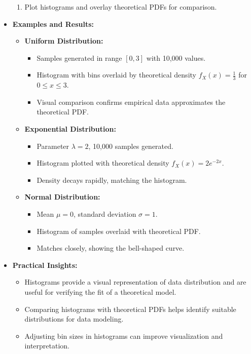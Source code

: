 \documentclass{article}
\begin{document}
\begin{itemize}
\begin{enumerate}
      \item Plot histograms and overlay theoretical PDFs for comparison.
    \end{enumerate}

  \item \textbf{Examples and Results:}
    \begin{itemize}
      \item \textbf{Uniform Distribution:}
        \begin{itemize}
          \item Samples generated in range $[0, 3]$ with 10,000 values.
          \item Histogram with bins overlaid by theoretical density $f_X(x) = \frac{1}{3}$ for $0 \leq x \leq 3$.
          \item Visual comparison confirms empirical data approximates the theoretical PDF.
        \end{itemize}

      \item \textbf{Exponential Distribution:}
        \begin{itemize}
          \item Parameter $\lambda = 2$, 10,000 samples generated.
          \item Histogram plotted with theoretical density $f_X(x) = 2e^{-2x}$.
          \item Density decays rapidly, matching the histogram.
        \end{itemize}

      \item \textbf{Normal Distribution:}
        \begin{itemize}
          \item Mean $\mu = 0$, standard deviation $\sigma = 1$.
          \item Histogram of samples overlaid with theoretical PDF.
          \item Matches closely, showing the bell-shaped curve.
        \end{itemize}
    \end{itemize}

  \item \textbf{Practical Insights:}
    \begin{itemize}
      \item Histograms provide a visual representation of data distribution and are useful for verifying the fit of a theoretical model.
      \item Comparing histograms with theoretical PDFs helps identify suitable distributions for data modeling.
      \item Adjusting bin sizes in histograms can improve visualization and interpretation.
    \end{itemize}


\end{itemize}
\end{document}
